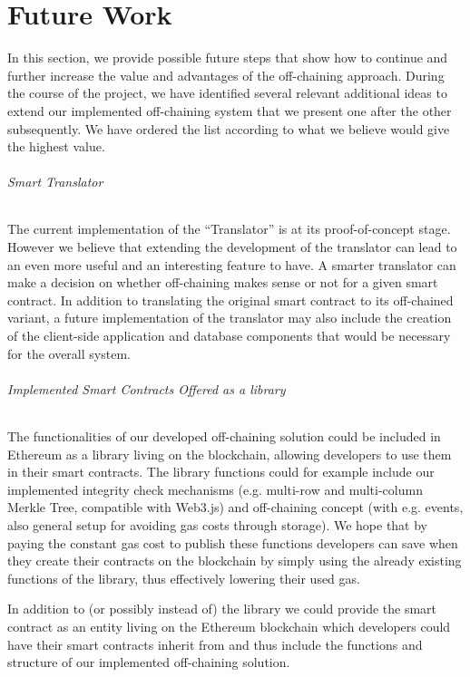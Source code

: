 \chapter{Future Work} \label{sec:future_work}
In this section, we provide possible future steps that show how to continue and further increase the value and advantages of the off-chaining approach. During the course of the project, we have identified several relevant additional ideas to extend our implemented off-chaining system that we present one after the other subsequently. We have ordered the list according to what we believe would give the highest value.

\subparagraph{Smart Translator}
The current implementation of the “Translator” is at its proof-of-concept stage. However we believe that extending the development of the translator can lead to an even more useful and an interesting feature to have. A smarter translator can make a decision on whether off-chaining makes sense or not for a given smart contract. In addition to translating the original smart contract to its off-chained variant, a future implementation of the translator may also include the creation of the client-side application and database components that would be necessary for the overall system.

\subparagraph{Implemented Smart Contracts Offered as a library}
The functionalities of our developed off-chaining solution could be included in Ethereum as a library living on the blockchain, allowing developers to use them in their smart contracts. The library functions could for example include our implemented integrity check mechanisms (e.g. multi-row and multi-column Merkle Tree, compatible with Web3.js) and off-chaining concept (with e.g. events, also general setup for avoiding gas costs through storage). We hope that by paying the constant gas cost to publish these functions developers can save when they create their contracts on the blockchain by simply using the already existing functions of the library, thus effectively lowering their used gas.

In addition to (or possibly instead of) the library we could provide the smart contract as an entity living on the Ethereum blockchain which developers could have their smart contracts inherit from and thus include the functions and structure of our implemented off-chaining solution.

